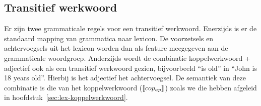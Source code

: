 
\subsection{Transitief werkwoord}
\label{sec:gramm-tv}

Er zijn twee grammaticale regels voor een transitief werkwoord. Enerzijds is er de standaard mapping van grammatica naar lexicon. De voorzetsels en achtervoegsels uit het lexicon worden dan als feature meegegeven aan de grammaticale woordgroep. Anderzijds wordt de combinatie koppelwerkwoord + adjectief ook als een transitief werkwoord gezien, bijvoorbeeld ``is old'' in ``John is 18 years old''. Hierbij is het adjectief het achtervoegsel. De semantiek van deze combinatie is die van het koppelwerkwoord ($\llbracket cop_{ap}\rrbracket$) zoals we die hebben afgeleid in hoofdstuk~\ref{sec:lex-koppelwerkwoord}.



